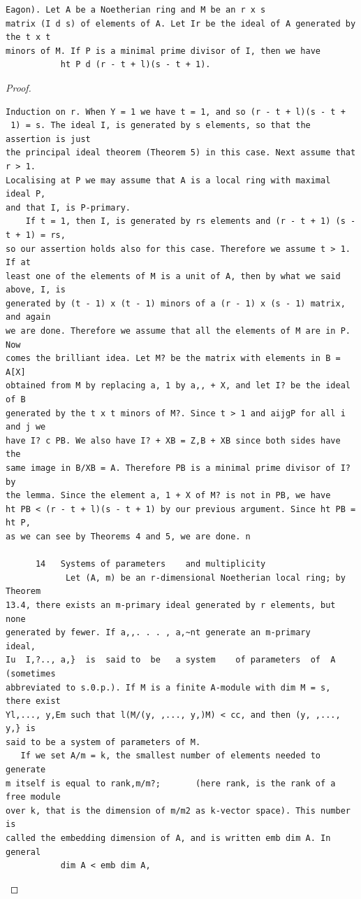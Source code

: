 \begin{theorem}\label{mcrt-auto-theorem-13-10}\uses{}
\begin{verbatim}
Eagon). Let A be a Noetherian ring and M be an r x s
matrix (I d s) of elements of A. Let Ir be the ideal of A generated by the t x t
minors of M. If P is a minimal prime divisor of I, then we have
           ht P d (r - t + l)(s - t + 1).
\end{verbatim}
\end{theorem}
\begin{proof}
\begin{verbatim}
Induction on r. When Y = 1 we have t = 1, and so (r - t + l)(s - t +
 1) = s. The ideal I, is generated by s elements, so that the assertion is just
the principal ideal theorem (Theorem 5) in this case. Next assume that r > 1.
Localising at P we may assume that A is a local ring with maximal ideal P,
and that I, is P-primary.
    If t = 1, then I, is generated by rs elements and (r - t + 1) (s - t + 1) = rs,
so our assertion holds also for this case. Therefore we assume t > 1. If at
least one of the elements of M is a unit of A, then by what we said above, I, is
generated by (t - 1) x (t - 1) minors of a (r - 1) x (s - 1) matrix, and again
we are done. Therefore we assume that all the elements of M are in P. Now
comes the brilliant idea. Let M? be the matrix with elements in B = A[X]
obtained from M by replacing a, 1 by a,, + X, and let I? be the ideal of B
generated by the t x t minors of M?. Since t > 1 and aijgP for all i and j we
have I? c PB. We also have I? + XB = Z,B + XB since both sides have the
same image in B/XB = A. Therefore PB is a minimal prime divisor of I? by
the lemma. Since the element a, 1 + X of M? is not in PB, we have
ht PB < (r - t + l)(s - t + 1) by our previous argument. Since ht PB = ht P,
as we can see by Theorems 4 and 5, we are done. n

      14   Systems of parameters    and multiplicity
            Let (A, m) be an r-dimensional Noetherian local ring; by Theorem
13.4, there exists an m-primary ideal generated by r elements, but none
generated by fewer. If a,,. . . , a,~nt generate an m-primary             ideal,
Iu  I,?.., a,}  is  said to  be   a system    of parameters  of  A  (sometimes
abbreviated to s.0.p.). If M is a finite A-module with dim M = s, there exist
Yl,..., y,Em such that l(M/(y, ,..., y,)M) < cc, and then (y, ,..., y,} is
said to be a system of parameters of M.
   If we set A/m = k, the smallest number of elements needed to generate
m itself is equal to rank,m/m?;       (here rank, is the rank of a free module
over k, that is the dimension of m/m2 as k-vector space). This number is
called the embedding dimension of A, and is written emb dim A. In general
           dim A < emb dim A,
\end{verbatim}
\end{proof}


